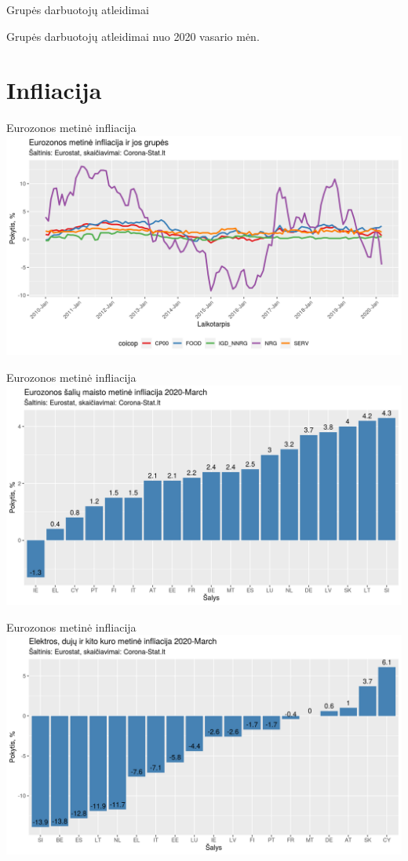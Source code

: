 \documentclass[11pt]{beamer}
\begin{document}
\begin{frame}{Grupės darbuotojų atleidimai}

Grupės darbuotojų atleidimai nuo 2020 vasario mėn.

\end{frame}


\section{Infliacija}
\begin{frame}{Eurozonos metinė infliacija}
\includegraphics[scale=0.5]{infliacija_ez.png}
\end{frame}

\begin{frame}{Eurozonos metinė infliacija}
\includegraphics[scale=0.5]{infliacija_maistas.png}
\end{frame}

\begin{frame}{Eurozonos metinė infliacija}
\includegraphics[scale=0.5]{infliacija_elektra_dujos.png}
\end{frame}
\end{document}
